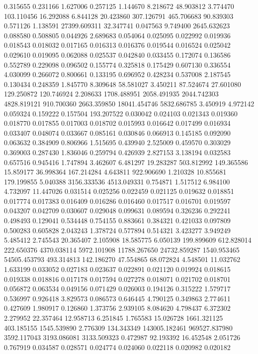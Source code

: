 0.315655
0.231166
1.627006
0.257125
1.144670
8.218672
48.903812
3.774470
103.110456
16.292088
6.844128
20.423860
307.126791
465.706683
90.839303
0.571126
1.138591
27399.609311
32.347741
0.047563
9.749400
2645.632623
0.088580
0.508805
0.044926
2.689683
0.054064
0.025095
0.022992
0.019936
0.018543
0.018032
0.017165
0.016313
0.016376
0.019544
0.016524
0.025042
0.029610
0.019095
0.062088
0.025537
0.042840
0.033455
0.172074
0.136586
0.552789
0.229098
0.096502
0.155774
0.325818
0.175429
0.607130
0.336554
4.030099
0.266072
0.800661
0.133195
0.696952
0.428234
0.537008
2.187545
0.130434
0.248359
1.845770
8.309648
58.581027
3.450211
87.524674
27.601080
129.250872
120.746924
2.208633
1708.488951
2058.491935
2044.742303
4828.819121
910.700360
2663.359850
18041.454746
5832.686785
3.450919
4.972142
0.059324
0.159222
0.157504
193.207522
0.030042
0.024103
0.021343
0.019360
0.018770
0.017855
0.017003
0.018702
0.015993
0.016642
0.017499
0.016934
0.033407
0.048074
0.033667
0.085161
0.030846
0.066913
0.145185
0.092090
0.063632
0.384909
0.806966
1.515695
0.439940
2.525009
0.459570
0.303029
0.369003
0.287430
1.836046
0.259794
0.426939
2.827153
3.138194
0.032583
0.657516
0.945416
1.747894
3.462607
6.481297
19.283287
503.812992
149.365586
15.859177
36.998364
167.214284
4.643811
922.906690
1.210328
10.855681
179.199855
5.040388
3156.333536
4513.049331
0.754871
1.517512
6.984100
4.732097
11.447026
0.031514
0.025256
0.022459
0.021125
0.019632
0.018851
0.017774
0.017383
0.016409
0.016286
0.016460
0.017517
0.016701
0.019597
0.043207
0.042709
0.030607
0.029048
0.099631
0.089594
0.326236
0.292241
0.498493
0.129041
0.534448
0.754155
0.883661
0.384321
0.421033
0.097809
0.500283
0.605828
2.043243
1.378724
0.577894
0.514321
3.423277
3.949249
5.485412
2.745543
20.365407
2.105908
18.585775
6.050139
199.899609
612.828014
222.650376
4370.038114
5972.101908
11788.267650
24732.859287
1540.953465
54505.453793
493.314813
142.186270
47.554865
68.072824
4.548501
11.032762
1.633199
0.033052
0.027183
0.023637
0.022891
0.021120
0.019924
0.018615
0.019338
0.018816
0.017178
0.017594
0.027278
0.018071
0.021702
0.018701
0.056872
0.063534
0.049156
0.071429
0.026003
0.194126
0.315222
1.579717
0.536997
0.926418
3.829573
0.086573
0.646445
4.790125
0.349863
2.774611
0.427609
1.980917
0.126860
1.373756
2.939105
8.084620
4.798437
6.372302
2.279952
22.357464
12.958713
6.251845
1.765583
15.026728
1661.321125
403.185155
1545.539890
2.776309
134.343349
143005.182461
969527.837980
3592.117043
3193.086081
3133.509323
0.472987
92.193392
16.452548
2.051726
0.767919
0.034587
0.028571
0.024774
0.024060
0.022118
0.020982
0.020182
